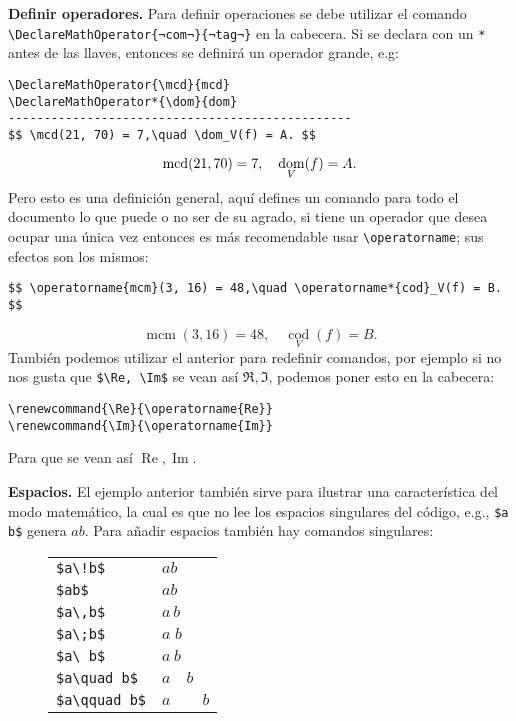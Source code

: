 \documentclass[intro-breve-latex.tex]{subfiles}
\begin{document}
\textbf{Definir operadores.} Para definir operaciones se debe utilizar el comando \lstinline|\DeclareMathOperator{¬com¬}{¬tag¬}| en la cabecera. Si se declara con un \texttt{*} antes de las llaves, entonces se definirá un operador grande, e.g:
\begin{lstlisting}
\DeclareMathOperator{\mcd}{mcd}
\DeclareMathOperator*{\dom}{dom}
------------------------------------------------
$$ \mcd(21, 70) = 7,\quad \dom_V(f) = A. $$
\end{lstlisting}
$$ \mcd(21, 70) = 7,\quad \dom_V(f) = A. $$
Pero esto es una definición general, aquí defines un comando para todo el documento lo que puede o no ser de su agrado, si tiene un operador que desea ocupar una única vez entonces es más recomendable usar \lstinline|\operatorname|; sus efectos son los mismos:
\begin{lstlisting}
$$ \operatorname{mcm}(3, 16) = 48,\quad \operatorname*{cod}_V(f) = B. $$
\end{lstlisting}
$$ \operatorname{mcm}(3, 16) = 48,\quad \operatorname*{cod}_V(f) = B. $$
También podemos utilizar el anterior para redefinir comandos, por ejemplo si no nos gusta que \lstinline|$\Re, \Im$| se vean así $\Re, \Im$, podemos poner esto en la cabecera:
\begin{lstlisting}
\renewcommand{\Re}{\operatorname{Re}}
\renewcommand{\Im}{\operatorname{Im}}
\end{lstlisting}
Para que se vean así $\operatorname{Re}, \operatorname{Im}$.

\textbf{Espacios.}
El ejemplo anterior también sirve para ilustrar una característica del modo matemático, la cual es que no lee los
espacios singulares del código, e.g., \lstinline|$a     b$| genera $a     b$. Para añadir espacios también hay comandos
singulares:
\begin{figure}[!h]
	\centering
	\begin{longtable}{ll}
		\hline \hline
		\endhead
		\hline \hline
		\endfoot

		\lstinline|$a\!b$|      & $a\!b$ \\
		\lstinline|$ab$|        & $ab$ \\
		\lstinline|$a\,b$|      & $a\,b$ \\
		\lstinline|$a\;b$|      & $a\;b$ \\
		\lstinline|$a\ b$|      & $a\ b$ \\
		\lstinline|$a\quad b$|  & $a\quad b$ \\
		\lstinline|$a\qquad b$| & $a\qquad b$ \\
	\end{longtable}
\end{figure}
\end{document}

